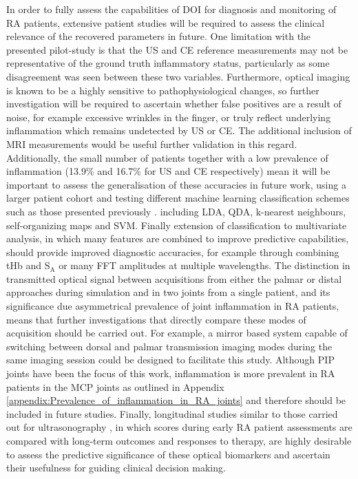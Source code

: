 \documentclass[twoside]{bhamthesis}
\theoremstyle{definition}
\begin{document}
In order to fully assess the capabilities of DOI for diagnosis and monitoring of RA patients, extensive patient studies will be required to assess the clinical relevance of the recovered parameters in future. One limitation with the presented pilot-study is that the US and CE reference measurements may not be representative of the ground truth inflammatory status, particularly as some disagreement was seen between these two variables. Furthermore, optical imaging is known to be a highly sensitive to pathophysiological changes, so further investigation will be required to ascertain whether false positives are a result of noise, for example excessive wrinkles in the finger, or truly reflect underlying inflammation which remains undetected by US or CE. The additional inclusion of MRI measurements would be useful further validation in this regard. Additionally, the small number of patients together with a low prevalence of inflammation (13.9\% and 16.7\% for US and CE respectively) mean it will be important to assess the generalisation of these accuracies in future work, using a larger patient cohort and testing different machine learning classification schemes such as those presented previously \cite{montejo2013computer2,schwaighofer2003classification}. 
including LDA, QDA, k-nearest neighbours, self-organizing maps and SVM. Finally extension of classification to multivariate analysis, in which many features are combined to improve predictive capabilities, should provide improved diagnostic accuracies, for example through combining tHb and $\mathrm{S_A}$ or many FFT amplitudes at multiple wavelengths. The distinction in transmitted optical signal between acquisitions from either the palmar or distal approaches during simulation and in two joints from a single patient, and its significance due asymmetrical prevalence of joint inflammation in RA patients, means that further investigations that directly compare these modes of acquisition should be carried out. For example, a mirror based system capable of switching between dorsal and palmar transmission imaging modes during the same imaging session could be designed to facilitate this study. Although PIP joints have been the focus of this work, inflammation is more prevalent in RA patients in the MCP joints as outlined in Appendix \ref{appendix:Prevalence_of_inflammation_in_RA_joints} and therefore should be included in future studies. Finally, longitudinal studies similar to those carried out for ultrasonography \cite{filer2011utility}, in which scores during early RA patient assessments are compared with long-term outcomes and responses to therapy, are highly desirable to assess the predictive significance of these optical biomarkers and ascertain their usefulness for guiding clinical decision making. 
\end{document}

